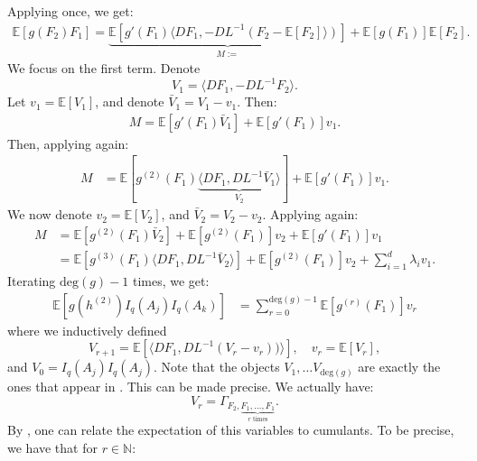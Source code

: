 \documentclass[]{article}
\numberwithin{equation}{section}
\theoremstyle{definition}
\newcommand{\EE}{\mathbb{E}}
\newcommand{\NN}{\mathbb{N}}
\begin{document}
Applying  once, we get: 
\begin{align}
    \EE \left [ g(F_2) F_1\right ] = \underbrace{\EE \left [ g'(F_1) \langle D F_1, -DL^{-1}(F_2 - \EE[F_2] \rangle)\right ]}_{M:=} + \mathbb{E}[g(F_1)]\EE[F_2] . 
\end{align}
We focus on the first term. Denote 
\begin{equation}
    V_{1} = \langle DF_1, -DL^{-1}F_2 \rangle.
\end{equation}
Let $v_1 = \EE [V_{1}]$, and denote $\bar{V}_1 = V_1 - v_1$. Then: 
\begin{align}
    M = \EE \left [ g'(F_1) 
    \bar{V}_{1}\right ] + \EE[g'(F_1)]v_{1}. 
\end{align}
Then, applying  again: 
\begin{align}
     M &=  \mathbb{E} \left [g^{(2)}(F_1) \underbrace{\langle DF_1, DL^{-1}\bar{V}_1\rangle}_{V_2} \right ] + \EE[g'(F_1)] v_1. 
\end{align}
We now denote $v_{2}  = \EE \left [ V_2\right ]$, and $\bar{V}_{2} = V_{2} - v_{2}$. Applying  again: 
\begin{align}
    M & = \mathbb{E} \left [g^{(2)}(F_1) \bar{V}_{2} \right ] + \EE\left [ g^{(2)}(F_1)\right]v_{2} + \EE[g'(F_1)] v_1 \\ 
    & =  \mathbb{E} \left [g^{(3)}(F_1) \langle DF_1, DL^{-1}\bar{V}_{2} \rangle\right ] + \EE[g^{(2)}(F_1)]v_{2} + \sum_{i=1}^{d} \lambda_{i} v_1.
\end{align}
Iterating $\mathrm{deg}(g)-1$ times, we get: 
\begin{align}
    \EE \left [ g(h^{(2)}) I_{q}(A_j) I_{q}(A_k)\right ] &= \sum_{r = 0}^{\mathrm{deg}(g)-1} \EE[g^{(r)}(F_1)]v_{r}
    \label{eq:full_expression_expectation}
\end{align}
where we inductively defined 
\begin{equation}
    V_{r+1} = \EE \left [\langle DF_1, DL^{-1}(V_{r}-v_{r})) \rangle \right ], 
    \quad 
    v_{r} = \EE \left [ V_{r} \right],
\end{equation}
and $V_0 = I_{q}(A_j)I_{q}(A_j)$. Note that the objects $V_1, \dots V_{\mathrm{deg}(g)}$ are exactly the ones that appear in . This can be made precise. We actually have:
\begin{equation}
    V_{r} = \Gamma_{F_2, \underbrace{F_1, \dots, F_1}_{r \text{ times}}}. 
    \label{eq:V_and_F}
\end{equation}
By , one can relate the expectation of this variables to cumulants.  To be precise, we have that for $r \in \NN$: 
\end{document}
